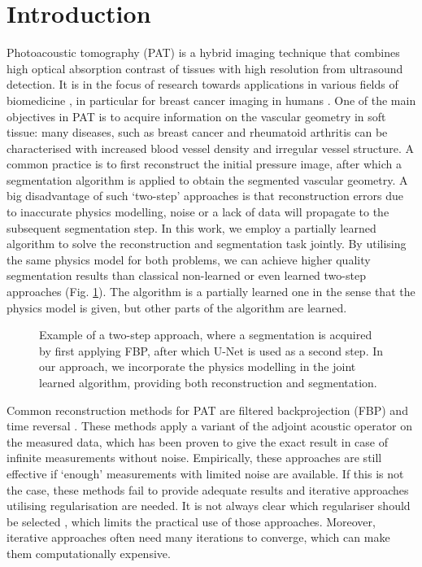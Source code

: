 \documentclass[journal]{IEEEtran}
\begin{document}
\IEEEpeerreviewmaketitle
\vspace{-3mm}
\section{Introduction}
Photoacoustic tomography (PAT) is a hybrid imaging technique that combines high optical absorption contrast of tissues with high resolution from ultrasound detection. It is in the focus of research towards applications in various fields of biomedicine \cite{Zhou2016}, in particular for breast cancer imaging in humans \cite{Heijblom2015, Toi2017, Lin2018}. One of the main objectives in PAT is to acquire information on the vascular geometry in soft tissue: many diseases, such as breast cancer and rheumatoid arthritis can be characterised with increased blood vessel density and irregular vessel structure. A common practice is to first reconstruct the initial pressure image, after which a segmentation algorithm is applied to obtain the segmented vascular geometry. A big disadvantage of such `two-step' approaches is that reconstruction errors due to inaccurate physics modelling, noise or a lack of data will propagate to the subsequent segmentation step. In this work, we employ a partially learned algorithm to solve the reconstruction and segmentation task jointly. By utilising the {same} physics model for both problems, we can achieve higher quality segmentation results than classical non-learned or even learned two-step approaches (Fig. \ref{fig:UNet_vs_LPD}). {The algorithm is a partially learned one in the sense that the physics model is given, but other parts of the algorithm are learned}.

\begin{figure}[!ht]
\resizebox{\linewidth}{!}{%
\begin{tikzpicture}

\end{tikzpicture}}
\caption{Example of a two-step approach, where a segmentation is acquired by first applying FBP, after which U-Net is used as a second step. In our approach, we incorporate the physics modelling in the joint learned algorithm, providing both reconstruction and segmentation.}
\label{fig:UNet_vs_LPD}
\vspace{-4mm}
\end{figure}

Common reconstruction methods for PAT are filtered backprojection (FBP) \cite{Kruger1995, Finch2004, Willemink2010, Haltmeier2014} and time reversal \cite{Burgholzer2007, Treeby2010}. These methods apply a variant of the adjoint acoustic operator on the measured data, which has been proven to give the exact result in case of infinite measurements without noise. Empirically, these approaches are still effective if `enough' measurements with limited noise are available. If this is not the case, these methods fail to provide adequate results and iterative approaches utilising regularisation \cite{Dean-Ben2012a, Huang2013, Arridge2016a, Arridge2016b, Boink2018, Nguyen2018, Frikel2018} are needed. It is not always clear which regulariser should be selected \cite{Boink2018}, which limits the practical use of those approaches. Moreover, iterative approaches often need many iterations to converge, which can make them computationally expensive.
\end{document}
